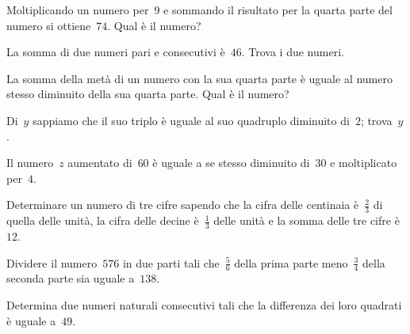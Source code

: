 \begin{multicols}{2}
\begin{esercizio}[\Ast]
Moltiplicando un numero per~9 e sommando il risultato per la quarta parte del numero si ottiene~$74$. Qual è il numero?
\end{esercizio}

\begin{esercizio}
La somma di due numeri pari e consecutivi è~$46$. Trova i due numeri.
\end{esercizio}

\begin{esercizio}[\Ast]
La somma della metà di un numero con la sua quarta parte è uguale al numero stesso diminuito della sua quarta parte. Qual è il numero?
\end{esercizio}

\begin{esercizio}[\Ast]
Di~$y$ sappiamo che il suo triplo è uguale al suo quadruplo diminuito di~$2$; trova~$y$.
\end{esercizio}

\begin{esercizio}
Il numero~$z$ aumentato di~$60$ è uguale a se stesso diminuito di~$30$ e moltiplicato per~$4$.
\end{esercizio}

\begin{esercizio}[\Ast]
Determinare un numero di tre cifre sapendo che la cifra delle centinaia è~$\frac{2}{3}$ di quella delle unità, la cifra delle decine è~$\frac{1}{3}$ delle unità e la somma delle tre cifre è~$12$.
\end{esercizio}

\begin{esercizio}[\Ast]
Dividere il numero~$576$ in due parti tali che~$\frac{5}{6}$ della prima parte meno~$\frac{3}{4}$ della seconda parte sia uguale a~$138$.
\end{esercizio}

\begin{esercizio}[\Ast]
Determina due numeri naturali consecutivi tali che la differenza dei loro quadrati è uguale a~$49$.
\end{esercizio}
\end{multicols}

